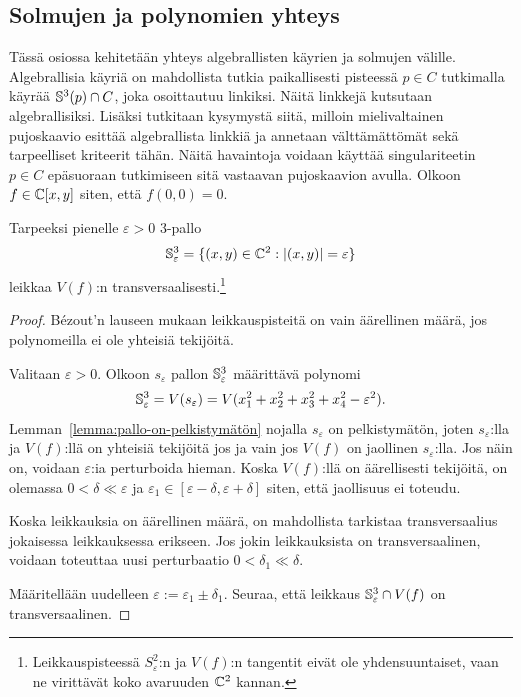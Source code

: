 \subsection{Solmujen ja polynomien yhteys}
\label{kpl:solmujen-ja-polynomien-yhteys}
Tässä osiossa kehitetään yhteys algebrallisten käyrien ja solmujen välille. Algebrallisia käyriä on mahdollista tutkia paikallisesti pisteessä $p\in C$ tutkimalla käyrää $\S^3(p)\cap C$, joka osoittautuu linkiksi. Näitä linkkejä kutsutaan algebrallisiksi. Lisäksi tutkitaan kysymystä siitä, milloin mielivaltainen pujoskaavio esittää algebrallista linkkiä ja annetaan välttämättömät sekä tarpeelliset kriteerit tähän. Näitä havaintoja voidaan käyttää singulariteetin $p\in C$ epäsuoraan tutkimiseen sitä vastaavan pujoskaavion avulla. Olkoon $f\in\C[x,y]$ siten, että $f(0,0)=0$.
\begin{lemma}
    Tarpeeksi pienelle $\varepsilon>0$ 3-pallo
    \begin{align*}
        \S_\varepsilon^3=\{(x,y)\in\C^2:|(x,y)|=\varepsilon\}
    \end{align*}
    leikkaa $V(f)$:n transversaalisesti.\footnote{Leikkauspisteessä $S_\varepsilon^2$:n ja $V(f)$:n tangentit eivät ole yhdensuuntaiset, vaan ne virittävät koko avaruuden $\C^2$ kannan.}
\end{lemma}
\begin{proof}
    Bézout'n lauseen mukaan leikkauspisteitä on vain äärellinen määrä, jos polynomeilla ei ole yhteisiä tekijöitä.

    Valitaan $\varepsilon>0$. Olkoon $s_\varepsilon$ pallon $\S_\varepsilon^3$ määrittävä polynomi
    \begin{align*}
        \S_\varepsilon^3=V(s_\varepsilon)=V(x_1^2+x_2^2+x_3^2+x_4^2-\varepsilon^2).
    \end{align*}
    Lemman~\ref{lemma:pallo-on-pelkistymätön} nojalla $s_\varepsilon$ on pelkistymätön, joten $s_\varepsilon$:lla ja $V(f)$:llä on yhteisiä tekijöitä jos ja vain jos $V(f)$ on jaollinen $s_\varepsilon$:lla. Jos näin on, voidaan $\varepsilon$:ia perturboida hieman. Koska $V(f)$:llä on äärellisesti tekijöitä, on olemassa $0<\delta\ll\varepsilon$ ja $\varepsilon_1\in[\varepsilon-\delta,\varepsilon+\delta]$ siten, että jaollisuus ei toteudu.

    Koska leikkauksia on äärellinen määrä, on mahdollista tarkistaa transversaalius jokaisessa leikkauksessa erikseen. Jos jokin leikkauksista on transversaalinen, voidaan toteuttaa uusi perturbaatio $0<\delta_1\ll\delta$. 
    
    Määritellään uudelleen $\varepsilon:= \varepsilon_1 \pm \delta_1$. Seuraa, että leikkaus $\S_{\varepsilon}^3\cap V(f)$ on transversaalinen.
\end{proof}
